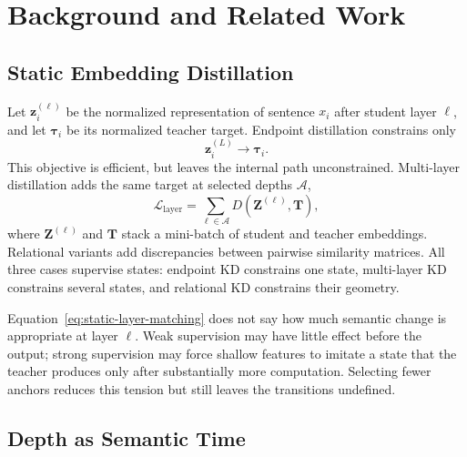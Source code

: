 \section{Background and Related Work}
\label{sec:motivation}

\subsection{Static Embedding Distillation}
\label{sec:static-state-matching}

Let $\mathbf{z}^{(\ell)}_i$ be the normalized representation of sentence $x_i$
after student layer $\ell$, and let $\boldsymbol{\tau}_i$ be its normalized
teacher target. Endpoint distillation constrains only
\begin{equation}
    \mathbf{z}^{(L)}_i \longrightarrow \boldsymbol{\tau}_i.
    \label{eq:endpoint-schematic}
\end{equation}
This objective is efficient, but leaves the internal path unconstrained.
Multi-layer distillation adds the same target at selected depths
$\mathcal{A}$,
\begin{equation}
    \mathcal{L}_{\mathrm{layer}}
    =
    \sum_{\ell\in\mathcal{A}}
    D\!\left(\mathbf{Z}^{(\ell)},\mathbf{T}\right),
    \label{eq:static-layer-matching}
\end{equation}
where $\mathbf{Z}^{(\ell)}$ and $\mathbf{T}$ stack a mini-batch of student and
teacher embeddings. Relational variants add discrepancies between pairwise
similarity matrices. All three cases supervise states: endpoint KD constrains
one state, multi-layer KD constrains several states, and relational KD
constrains their geometry.

Equation~\ref{eq:static-layer-matching} does not say how much semantic change is
appropriate at layer $\ell$. Weak supervision may have little effect before the
output; strong supervision may force shallow features to imitate a state that
the teacher produces only after substantially more computation. Selecting
fewer anchors reduces this tension but still leaves the transitions undefined.

\subsection{Depth as Semantic Time}
\label{sec:semantic-time}

